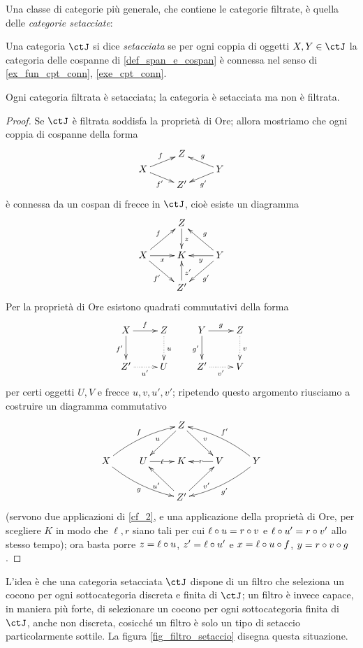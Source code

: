 Una classe di categorie più generale, che contiene le categorie filtrate, è quella delle \emph{categorie setacciate}:
\begin{definition}\label{def_cat_setacciata}
	Una categoria \(\ctJ\) si dice \emph{setacciata} se per ogni coppia di oggetti \(X,Y\in\ctJ\) la categoria delle cospanne di \ref{def_span_e_cospan} è connessa nel senso di \ref{ex_fun_cpt_conn}, \ref{exe_cpt_conn}.
\end{definition}
\begin{theorem}\label{filtr_setacciata}
	Ogni categoria filtrata è setacciata; la categoria \Todo{} è setacciata ma non è filtrata.
\end{theorem}
\begin{proof}
	Se \(\ctJ\) è filtrata soddisfa la proprietà di Ore; allora mostriamo che ogni coppia di cospanne della forma
	\[\xymatrix@R=1mm{
		&Z  & \\
		X \ar[dr]_{f'}\ar[ur]^f&& Y\ar[ul]_g\ar[dl]^{g'}\\
		& Z'
		}\]
	è connessa da un cospan di frecce in \(\ctJ\), cioè esiste un diagramma
	\[\xymatrix@R=7mm{
		&Z\ar[d]^z & \\
		X \ar[r]_x \ar[dr]_{f'}\ar[ur]^f& K & Y\ar[ul]_g\ar[dl]^{g'}\ar[l]^y\\
		& Z'\ar[u]_{z'}
		}\]
	Per la proprietà di Ore esistono quadrati commutativi della forma
	\[\xymatrix{
			X \ar[r]^f\ar[d]_{f'}& Z\ar@{.>}[d]^u & Y \ar[r]^g\ar[d]_{g'}& Z\ar@{.>}[d]^v\\
			Z' \ar@{.>}[r]_{u'} & U & Z' \ar@{.>}[r]_{v'}& V
		}\]
	per certi oggetti \(U,V\) e frecce \(u,v,u',v'\); ripetendo questo argomento riusciamo a costruire un diagramma commutativo
	\[
		\xymatrix{
		&  & Z \ar@{->}[ld]_{u} \ar@{->}[rd]^{v} &  &  \\
		X \ar@/^/@{->}[rru]^{f} \ar@/_/@{->}[rrd]_{g} & U \ar@{->}[r]|-{\ell} & K & V \ar@{->}[l]|-{r} & Y \ar@/_/@{->}[llu]_{f'} \ar@/^/@{->}[lld]^{g'} \\
		&  & Z' \ar@{->}[lu]^{u'} \ar@{->}[ru]_{v'} &  &
		}
	\]
	(servono due applicazioni di \ref{cf_2}, e una applicazione della proprietà di Ore, per scegliere \(K\) in modo che \(\ell,r\) siano tali per cui \(\ell\circ u = r\circ v\) e \(\ell\circ u' = r\circ v'\) allo stesso tempo); ora basta porre \(z = \ell\circ u \), \(z' =	\ell\circ u'\) e \(x = \ell\circ u\circ f\), \(y = r\circ v\circ g\).
\end{proof}
\begin{remark}
	L'idea è che una categoria setacciata \(\ctJ\) dispone di un filtro che seleziona un cocono per ogni sottocategoria discreta e finita di \(\ctJ\); un filtro è invece capace, in maniera più forte, di selezionare un cocono per ogni sottocategoria finita di \(\ctJ\), anche non discreta, cosicché un filtro è solo un tipo di setaccio particolarmente sottile. La figura \ref{fig_filtro_setaccio} disegna questa situazione.
\end{remark}
